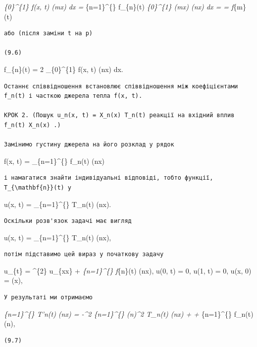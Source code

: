 \documentclass[
  ukrainian,
]{article}
\begin{document}
\int\emph{\{0\}\^{}\{1\} f(x, t) \sin(m\pi x) dx =
\sum}\{n=1\}\^{}\{\infty\} f\_\{n\}(t) \int\emph{\{0\}\^{}\{1\}
\sin(m\pi x) \sin(n\pi x) dx = =  f}\{m\}(t)

\begin{verbatim}
або (після заміни t на p)

(9.6)
\end{verbatim}

f\_\{n\}(t) = 2 \int\_\{0\}\^{}\{1\} f(x, t) \sin(n\pi x) dx.

\begin{verbatim}
Останнє співвідношення встановлює співвідношення між коефіцієнтами f_n(t) і часткою джерела тепла f(x, t).

КРОК 2. (Пошук u_n(x, t) = X_n(x) T_n(t) реакції на вхідний вплив f_n(t) X_n(x) .)

Замінимо густину джерела на його розклад у рядок
\end{verbatim}

f(x, t) = \sum\_\{n=1\}\^{}\{\infty\} f\_n(t) \sin(n\pi x)

\begin{verbatim}
і намагатися знайти індивідуальні відповіді, тобто функції, T_{\mathbf{n}}(t) у
\end{verbatim}

u(x, t) = \sum\_\{n=1\}\^{}\{\infty\} T\_n(t) \sin(n\pi x).

\begin{verbatim}
Оскільки розв'язок задачі має вигляд
\end{verbatim}

u(x, t) = \sum\_\{n=1\}\^{}\{\infty\} T\_n(t) \sin(n\pi x),

\begin{verbatim}
потім підставимо цей вираз у початкову задачу
\end{verbatim}

u\_\{t\} = \alpha\^{}\{2\} u\_\{xx\} + \sum\emph{\{n=1\}\^{}\{\infty\}
f}\{n\}(t) \sin(n\pi x), u(0, t) = 0, u(1, t) = 0, u(x, 0) = \varphi(x),

\begin{verbatim}
У результаті ми отримаємо
\end{verbatim}

\sum\emph{\{n=1\}\^{}\{\infty\} T'\emph{n(t) \sin(n\pi x) = -\alpha\^{}2
\sum}\{n=1\}\^{}\{\infty\} (n\pi)\^{}2 T\_n(t) \sin(n\pi x) + +
\sum}\{n=1\}\^{}\{\infty\} f\_n(t) \sin(\pi n\lambda),

\begin{verbatim}
(9.7)
\end{verbatim}
\end{document}
